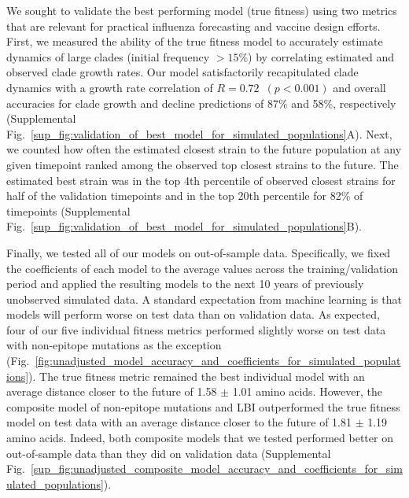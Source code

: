 We sought to validate the best performing model (true fitness) using two metrics that are relevant for practical influenza forecasting and vaccine design efforts.
First, we measured the ability of the true fitness model to accurately estimate dynamics of large clades (initial frequency $>15\%$) by correlating estimated and observed clade growth rates.
Our model satisfactorily recapitulated clade dynamics with a growth rate correlation of $R = 0.72$~$(p < 0.001)$ and overall accuracies for clade growth and decline predictions of 87\% and 58\%, respectively (Supplemental Fig.~\ref{sup_fig:validation_of_best_model_for_simulated_populations}A).
Next, we counted how often the estimated closest strain to the future population at any given timepoint ranked among the observed top closest strains to the future.
The estimated best strain was in the top 4th percentile of observed closest strains for half of the validation timepoints and in the top 20th percentile for 82\% of timepoints (Supplemental Fig.~\ref{sup_fig:validation_of_best_model_for_simulated_populations}B).

Finally, we tested all of our models on out-of-sample data.
Specifically, we fixed the coefficients of each model to the average values across the training/validation period and applied the resulting models to the next 10 years of previously unobserved simulated data.
A standard expectation from machine learning is that models will perform worse on test data than on validation data.
As expected, four of our five individual fitness metrics performed slightly worse on test data with non-epitope mutations as the exception (Fig.~\ref{fig:unadjusted_model_accuracy_and_coefficients_for_simulated_populations}).
The true fitness metric remained the best individual model with an average distance closer to the future of 1.58 $\pm$ 1.01 amino acids.
However, the composite model of non-epitope mutations and LBI outperformed the true fitness model on test data with an average distance closer to the future of 1.81 $\pm$ 1.19 amino acids.
Indeed, both composite models that we tested performed better on out-of-sample data than they did on validation data (Supplemental Fig.~\ref{sup_fig:unadjusted_composite_model_accuracy_and_coefficients_for_simulated_populations}).

